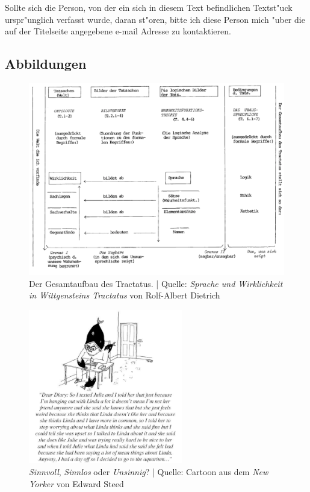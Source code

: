 \documentclass[emulatestandardclasses]{scrartcl}
\begin{document}
Sollte sich die Person, von der ein sich in diesem Text befindlichen Textst"uck urspr"unglich verfasst wurde, daran st"oren, bitte ich diese Person mich "uber die auf der Titelseite angegebene e-mail Adresse zu kontaktieren.
\subsection{Abbildungen}

\begin{figure}[h]
	\centering
	\includegraphics[width=1\textwidth]{images/tractatus/tractatus-structur.png}
	\caption{Der Gesamtaufbau des Tractatus. | Quelle: \emph{Sprache und Wirklichkeit in Wittgensteins Tractatus} von Rolf-Albert Dietrich}
	\label{fig:struct}
\end{figure}
\begin{figure}[h]
	\centering
	\includegraphics[width=0.6\textwidth]{images/tractatus/newyorker}
	\caption{\emph{Sinnvoll}, \emph{Sinnlos} oder \emph{Unsinnig}? | Quelle: Cartoon aus dem \emph{New Yorker} von Edward Steed}
	\label{fig:newyorker}
\end{figure}
\end{document}
